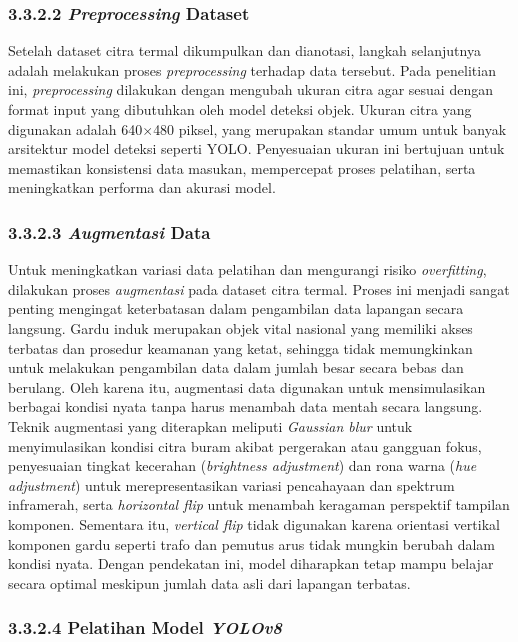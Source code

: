 \subsubsection{3.3.2.2 \emph{Preprocessing} Dataset}
Setelah dataset citra termal dikumpulkan dan dianotasi, langkah selanjutnya adalah melakukan proses \emph{preprocessing} terhadap data tersebut. Pada penelitian ini, \emph{preprocessing} dilakukan dengan mengubah ukuran citra agar sesuai dengan format input yang dibutuhkan oleh model deteksi objek. Ukuran citra yang digunakan adalah 640$\times$480 piksel, yang merupakan standar umum untuk banyak arsitektur model deteksi seperti YOLO. Penyesuaian ukuran ini bertujuan untuk memastikan konsistensi data masukan, mempercepat proses pelatihan, serta meningkatkan performa dan akurasi model.


\subsubsection{3.3.2.3 \emph{Augmentasi} Data}
Untuk meningkatkan variasi data pelatihan dan mengurangi risiko \emph{overfitting}, dilakukan proses \emph{augmentasi} pada dataset citra termal. Proses ini menjadi sangat penting mengingat keterbatasan dalam pengambilan data lapangan secara langsung. Gardu induk merupakan objek vital nasional yang memiliki akses terbatas dan prosedur keamanan yang ketat, sehingga tidak memungkinkan untuk melakukan pengambilan data dalam jumlah besar secara bebas dan berulang. Oleh karena itu, augmentasi data digunakan untuk mensimulasikan berbagai kondisi nyata tanpa harus menambah data mentah secara langsung. Teknik augmentasi yang diterapkan meliputi \emph{Gaussian blur} untuk menyimulasikan kondisi citra buram akibat pergerakan atau gangguan fokus, penyesuaian tingkat kecerahan (\emph{brightness adjustment}) dan rona warna (\emph{hue adjustment}) untuk merepresentasikan variasi pencahayaan dan spektrum inframerah, serta \emph{horizontal flip} untuk menambah keragaman perspektif tampilan komponen. Sementara itu, \emph{vertical flip} tidak digunakan karena orientasi vertikal komponen gardu seperti trafo dan pemutus arus tidak mungkin berubah dalam kondisi nyata. Dengan pendekatan ini, model diharapkan tetap mampu belajar secara optimal meskipun jumlah data asli dari lapangan terbatas.

\subsubsection{3.3.2.4 Pelatihan Model \emph{YOLOv8}}

